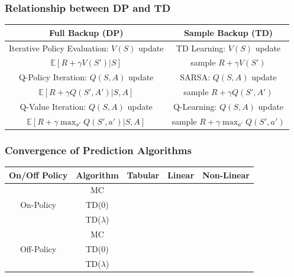 \documentclass[handout]{beamer}
\newcommand{\cmark}{\ding{51}}%
\newcommand{\xmark}{\ding{55}}%
\begin{document}
\begin{frame}
\frametitle{Relationship between DP and TD}
\pause
\begin{center}
      \begin{tabular}{c|c}
      {\bf Full Backup (DP)} & {\bf Sample Backup (TD)} \\ \hline
       Iterative Policy Evaluation: $V(S)$ update & TD Learning: $V(S)$ update \\
       $\mathbb{E}[R + \gamma V(S')|S]$ & sample $R + \gamma V(S')$ \\ \hline
      Q-Policy Iteration: $Q(S,A)$ update & SARSA: $Q(S,A)$ update \\
       $\mathbb{E}[R + \gamma Q(S',A')|S,A]$ & sample $R + \gamma Q(S',A')$ \\ \hline
       Q-Value Iteration: $Q(S,A)$ update & Q-Learning: $Q(S,A)$ update \\
       $\mathbb{E}[R + \gamma \max_{a'} Q(S',a')|S,A]$ & sample $R + \gamma \max_{a' } Q(S',a')$ \\ \hline
      \end{tabular} 
\end{center}      
\end{frame}

\begin{frame}
\frametitle{Convergence of Prediction Algorithms}
\pause
\begin{center}
      \begin{tabular}{ccccc}
      \hline
      On/Off Policy & Algorithm & Tabular & Linear & Non-Linear \\ \hline
      \multirow{3}{*}{On-Policy} & MC & \cmark & \cmark & \cmark \\
      & TD(0) & \cmark & \cmark & \xmark \\
      & TD($\lambda$) & \cmark & \cmark & \xmark \\ \hline
      \multirow{3}{*}{Off-Policy} & MC & \cmark & \cmark & \cmark \\
      & TD(0) & \cmark & \xmark & \xmark \\
      & TD($\lambda$) & \cmark & \xmark & \xmark \\ \hline
      \end{tabular}
\end{center}      
\end{frame}
\end{document}
